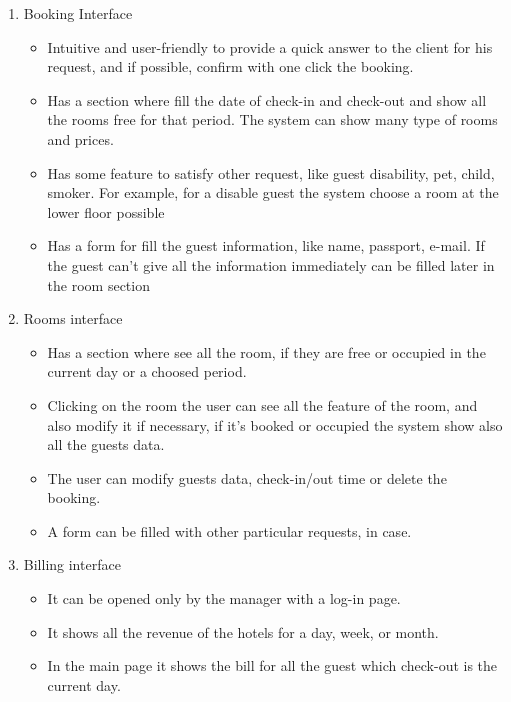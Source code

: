 \begin{enumerate}
	
\item Booking Interface
    \begin{itemize}
		\item Intuitive and user-friendly to provide a quick answer to the client for his request, and if possible, confirm with one click the booking.
		\item Has a section where fill the date of check-in and check-out and show all the rooms free for that period. The system can show many type of rooms and prices.
		\item Has some feature to satisfy other request, like guest disability, pet, child, smoker. For example, for a disable guest the system choose a room at the lower floor possible
		\item Has a form for fill the guest information, like name, passport, e-mail. If the guest can't give all the information immediately can be filled later in the room section
    \end{itemize}
	
\item Rooms interface
    \begin{itemize}
		\item Has a section where see all the room, if they are free or occupied in the current day or a choosed period.
		\item Clicking on the room the user can see all the feature of the room, and also modify it if necessary, if it's booked or occupied the system show also all the guests data.
		\item The user can modify guests data, check-in/out time or delete the booking. 
		\item A form can be filled with other particular requests, in case.
    \end{itemize}

\item Billing interface
    \begin{itemize}
		\item It can be opened only by the manager with a log-in page.
		\item It shows all the revenue of the hotels for a day, week, or month.
		\item In the main page it shows the bill for all the guest which check-out is the current day.
    \end{itemize}

\end{enumerate}

